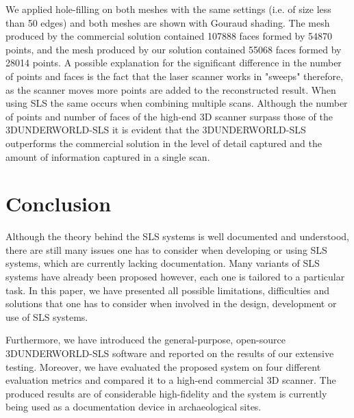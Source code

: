 \documentclass[final,12pt,3p]{elsarticle}
\begin{document}
We applied hole-filling on both meshes with the same settings (i.e. of size less than 50 edges) and both meshes are shown with Gouraud shading. The mesh produced by the commercial solution contained 107888 faces formed by 54870 points, and the mesh produced by our solution contained 55068 faces formed by 28014 points. A possible explanation for the significant difference in the number of points and faces is the fact that the laser scanner works in "sweeps" therefore, as the scanner moves more points are added to the reconstructed result. When using SLS the same occurs when combining multiple scans. Although the number of points and number of faces of the high-end 3D scanner surpass those of the 3DUNDERWORLD-SLS it is evident that the 3DUNDERWORLD-SLS outperforms the commercial solution in the level of detail captured and the amount of information captured in a single scan. 

\section{Conclusion}
\label{sec:conclusion}
Although the theory behind the SLS systems is well documented and understood, there are still many issues one has to consider when developing or using SLS systems, which are currently lacking documentation. Many variants of SLS systems have already been proposed however, each one is tailored to a particular task. In this paper, we have presented all possible limitations, difficulties and solutions that one has to consider when involved in the design, development or use of SLS systems.

Furthermore, we have introduced the general-purpose, open-source 3DUNDERWORLD-SLS software and reported on the results of our extensive testing. Moreover, we have evaluated the proposed system on four different evaluation metrics and compared it to a high-end commercial 3D scanner. The produced results are of considerable high-fidelity and the system is currently being used as a documentation device in archaeological sites.
\end{document}
